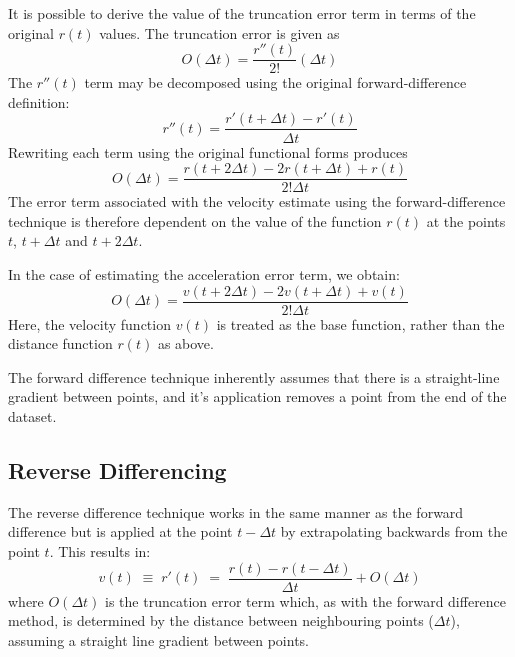 \documentclass[namedreferences]{SolarPhysics}
\begin{document}
\begin{article}
It is possible to derive the value of the truncation error term in terms of the original $r(t)$ values. The truncation error is given as
\begin{equation}
O(\Delta t) = \frac{r''(t)}{2!}(\Delta t)
\end{equation}
The $r''(t)$ term may be decomposed using the original forward-difference definition:
\begin{equation}
r''(t) = \frac{r'(t + \Delta t) - r'(t)}{\Delta t}
\end{equation}
Rewriting each term using the original functional forms produces
\begin{equation}
O(\Delta t) = \frac{r(t + 2\Delta t) - 2r(t + \Delta t) + r(t)}{2!\Delta t}
\end{equation}
The error term associated with the velocity estimate using the forward-difference technique is therefore dependent on the value of the function $r(t)$ at the points $t$, $t+\Delta t$ and $t+2\Delta t$.

In the case of estimating the acceleration error term, we obtain:
\begin{equation}
O(\Delta t) = \frac{v(t + 2\Delta t) - 2v(t + \Delta t) + v(t)}{2!\Delta t}
\end{equation}
Here, the velocity function $v(t)$ is treated as the base function, rather than the distance function $r(t)$ as above. 

The forward difference technique inherently assumes that there is a straight-line gradient between points, and it's application removes a point from the end of the dataset.

\subsection{Reverse Differencing}
\label{sect_reverse}

The reverse difference technique works in the same manner as the forward difference but is applied at the point $t - \Delta t$ by extrapolating backwards from the point $t$. This results in:
\begin{equation}
v(t) \; \equiv \; r'(t) \; = \; \frac{r(t ) - r(t - \Delta t)}{\Delta t} + O(\Delta t)
\end{equation}
where $O(\Delta t)$ is the truncation error term which, as with the forward difference method, is determined by the distance between neighbouring points ($\Delta t$), assuming a straight line gradient between points.



\end{article}
\end{document}

